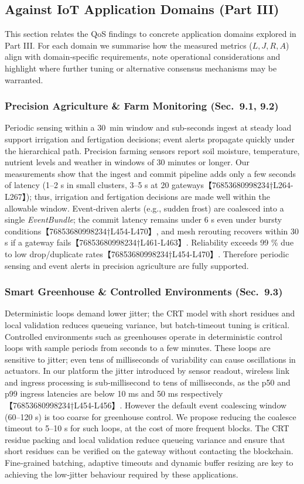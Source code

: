 \subsection{Against IoT Application Domains (Part III)}
\label{subsec:domains}

This section relates the QoS findings to concrete application domains explored in Part III.  For each domain we summarise how the measured metrics (\(L,J,R,A\)) align with domain‑specific requirements, note operational considerations and highlight where further tuning or alternative consensus mechanisms may be warranted.

\subsubsection{Precision Agriculture \& Farm Monitoring (Sec.~9.1, 9.2)}
Periodic sensing within a 30~min window and sub-seconds ingest at steady load support irrigation and fertigation decisions; event alerts propagate quickly under the hierarchical path. Precision farming sensors report soil moisture, temperature, nutrient levels and weather in windows of 30 minutes or longer.  Our measurements show that the ingest and commit pipeline adds only a few seconds of latency (1–2 s in small clusters, 3–5 s at 20 gateways【76853680998234†L264-L267】); thus, irrigation and fertigation decisions are made well within the allowable window.  Event‑driven alerts (e.g., sudden frost) are coalesced into a single \emph{EventBundle}; the commit latency remains under 6 s even under bursty conditions【76853680998234†L454-L470】, and mesh rerouting recovers within 30 s if a gateway fails【76853680998234†L461-L463】.  Reliability exceeds 99 \% due to low drop/duplicate rates【76853680998234†L454-L470】.  Therefore periodic sensing and event alerts in precision agriculture are fully supported.

\subsubsection{Smart Greenhouse \& Controlled Environments (Sec.~9.3)}
Deterministic loops demand lower jitter; the CRT model with short residues and local validation reduces queueing variance, but batch-timeout tuning is critical. Controlled environments such as greenhouses operate in deterministic control loops with sample periods from seconds to a few minutes.  These loops are sensitive to jitter; even tens of milliseconds of variability can cause oscillations in actuators.  In our platform the jitter introduced by sensor readout, wireless link and ingress processing is sub‑millisecond to tens of milliseconds, as the p50 and p99 ingress latencies are below 10 ms and 50 ms respectively【76853680998234†L454-L456】.  However the default event coalescing window (60–120 s) is too coarse for greenhouse control.  We propose reducing the coalesce timeout to 5–10 s for such loops, at the cost of more frequent blocks.  The CRT residue packing and local validation reduce queueing variance and ensure that short residues can be verified on the gateway without contacting the blockchain.  Fine‑grained batching, adaptive timeouts and dynamic buffer resizing are key to achieving the low‑jitter behaviour required by these applications.

